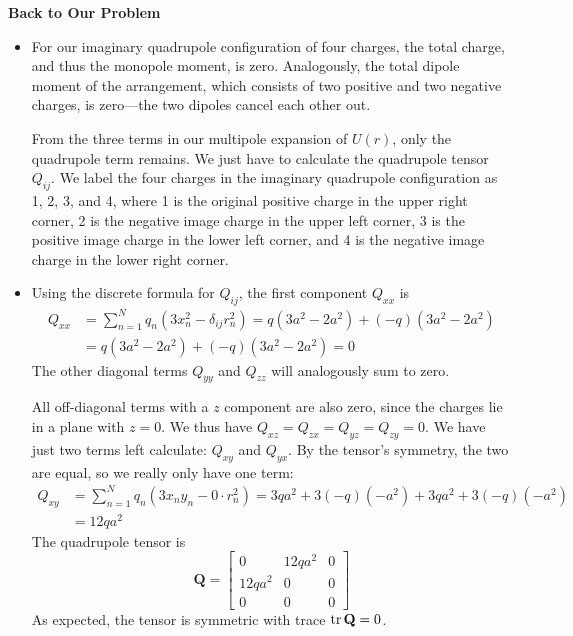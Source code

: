 \documentclass[11pt, a4paper]{article}
\newcommand{\mat}[1]{\mathbf{#1}} %
\begin{document}
\textbf{Back to Our Problem}
\begin{itemize}
	\item For our imaginary quadrupole configuration of four charges, the total charge, and thus the monopole moment, is zero. Analogously, the total dipole moment of the arrangement, which consists of two positive and two negative charges, is zero---the two dipoles cancel each other out. 
	
	From the three terms in our multipole expansion of $ U(r) $, only the quadrupole term remains. We just have to calculate the quadrupole tensor $ Q_{ij} $. We label the four charges in the imaginary quadrupole configuration as 1, 2, 3, and 4, where 1 is the original positive charge in the upper right corner, 2 is the negative image charge in the upper left corner, 3 is the positive image charge in the lower left corner, and 4 is the negative image charge in the lower right corner. 
	
	\item Using the discrete formula for $ Q_{ij} $, the first component $ Q_{xx} $ is 
	\begin{align*}
		Q_{xx} &= \sum_{n=1}^{N} q_{n} \left(3x_{n}^{2} - \delta_{ij}r_{n}^{2}\right) = q\left(3a^{2} - 2a^{2}\right) +  (-q)\left(3a^{2} - 2a^{2}\right)\\
		&= q\left(3a^{2} - 2a^{2}\right) +  (-q)\left(3a^{2} - 2a^{2}\right) = 0
	\end{align*}
	The other diagonal terms $ Q_{yy} $ and $ Q_{zz} $ will analogously sum to zero.
	
	All off-diagonal terms with a $ z $ component are also zero, since the charges lie in a plane with $ z = 0 $. We thus have
	$ Q_{xz} = Q_{zx} = Q_{yz} = Q_{zy} = 0$. We have just two terms left calculate: $ Q_{xy} $  and $ Q_{yx} $. By the tensor's symmetry, the two are equal, so we really only have one term:
	\begin{align*}
		Q_{xy} &= \sum_{n=1}^{N} q_{n} \left(3x_{n}y_{n} - 0\cdot r_{n}^{2}\right) = 3qa^{2} + 3(-q)(-a^{2}) + 3qa^{2} + 3(-q)(-a^{2})\\
		 &= 12qa^{2}
	\end{align*}
	The quadrupole tensor is
	\begin{equation*}
		\mat{Q} =
		\begin{bmatrix}
			0 & 12q a^{2} & 0\\
			12q a^{2} & 0 & 0\\
			0 & 0 & 0
		\end{bmatrix}
	\end{equation*}
	As expected, the tensor is symmetric with trace $ \tr \mat{Q} = 0 $. 
	

\end{itemize}
\end{document}
